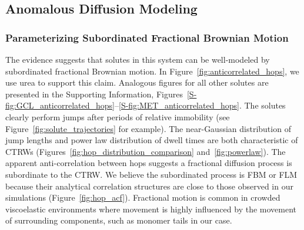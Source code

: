 \documentclass{article}
\begin{document}
%  
%    
  
  \subsection{Anomalous Diffusion Modeling}\label{section:sFBM}
  
  \subsubsection{Parameterizing Subordinated Fractional Brownian Motion}\label{section:AD_parameterization}

  The evidence suggests that solutes in this system can be well-modeled by subordinated
  fractional Brownian motion. In Figure~\ref{fig:anticorrelated_hops}, we use urea to
  support this claim. Analogous figures for all other solutes are presented in the Supporting
  Information, Figures~\ref{S-fig:GCL_anticorrelated_hops}--\ref{S-fig:MET_anticorrelated_hops}.
  The solutes clearly perform jumps after periods of relative
  immobility (see Figure~\ref{fig:solute_trajectories} for example). The near-Gaussian distribution
  of jump lengths and power law distribution of dwell times are both characteristic of 
  CTRWs (Figures~\ref{fig:hop_distribution_comparison} and~\ref{fig:powerlaw}). The apparent
  anti-correlation between hops suggests a fractional diffusion process is subordinate to the
  CTRW. We believe the subordinated process is FBM or FLM because their analytical correlation 
  structures are close to those observed in our simulations (Figure~\ref{fig:hop_acf}). Fractional
  motion is common in crowded viscoelastic environments where movement is highly influenced by
  the movement of surrounding components, such as monomer tails in our case.~\cite{ernst_fractional_2012}
  
\end{document}
